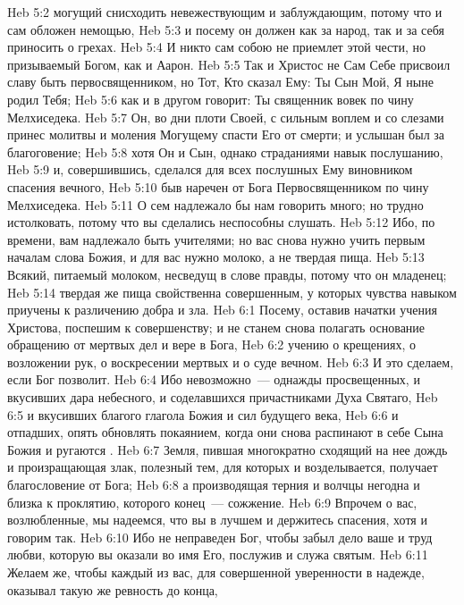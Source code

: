 \vs Heb 5:2 могущий снисходить невежествующим и заблуждающим, потому что и сам обложен немощью,
\vs Heb 5:3 и посему он должен как за народ, так и за себя приносить  о грехах.
\vs Heb 5:4 И никто сам собою не приемлет этой чести, но призываемый Богом, как и Аарон.
\vs Heb 5:5 Так и Христос не Сам Себе присвоил славу быть первосвященником, но Тот, Кто сказал Ему: Ты Сын Мой, Я ныне родил Тебя;
\vs Heb 5:6 как и в другом  говорит: Ты священник вовек по чину Мелхиседека.
\vs Heb 5:7 Он, во дни плоти Своей, с сильным воплем и со слезами принес молитвы и моления Могущему спасти Его от смерти; и услышан был за  благоговение;
\vs Heb 5:8 хотя Он и Сын, однако страданиями навык послушанию,
\vs Heb 5:9 и, совершившись, сделался для всех послушных Ему виновником спасения вечного,
\vs Heb 5:10 быв наречен от Бога Первосвященником по чину Мелхиседека.
\rsbpar\vs Heb 5:11 О сем надлежало бы нам говорить много; но трудно истолковать, потому что вы сделались неспособны слушать.
\vs Heb 5:12 Ибо,  по времени, вам надлежало быть учителями; но вас снова нужно учить первым началам слова Божия, и для вас нужно молоко, а не твердая пища.
\vs Heb 5:13 Всякий, питаемый молоком, несведущ в слове правды, потому что он младенец;
\vs Heb 5:14 твердая же пища свойственна совершенным, у которых чувства навыком приучены к различению добра и зла.
\vs Heb 6:1 Посему, оставив начатки учения Христова, поспешим к совершенству; и не станем снова полагать основание обращению от мертвых дел и вере в Бога,
\vs Heb 6:2 учению о крещениях, о возложении рук, о воскресении мертвых и о суде вечном.
\vs Heb 6:3 И это сделаем, если Бог позволит.
\vs Heb 6:4 Ибо невозможно~--- однажды просвещенных, и вкусивших дара небесного, и соделавшихся причастниками Духа Святаго,
\vs Heb 6:5 и вкусивших благого глагола Божия и сил будущего века,
\vs Heb 6:6 и отпадших, опять обновлять покаянием, когда они снова распинают в себе Сына Божия и ругаются .
\vs Heb 6:7 Земля, пившая многократно сходящий на нее дождь и произращающая злак, полезный тем, для которых и возделывается, получает благословение от Бога;
\vs Heb 6:8 а производящая терния и волчцы негодна и близка к проклятию, которого конец~--- сожжение.
\rsbpar\vs Heb 6:9 Впрочем о вас, возлюбленные, мы надеемся, что вы в лучшем  и держитесь спасения, хотя и говорим так.
\vs Heb 6:10 Ибо не неправеден Бог, чтобы забыл дело ваше и труд любви, которую вы оказали во имя Его, послужив и служа святым.
\vs Heb 6:11 Желаем же, чтобы каждый из вас, для совершенной уверенности в надежде, оказывал такую же ревность до конца,
